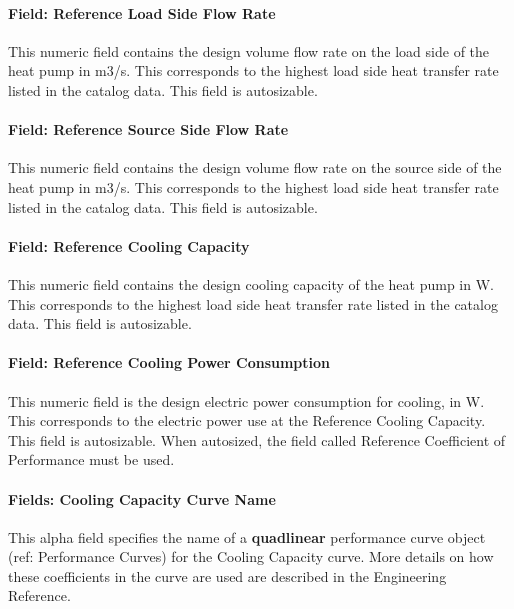 \paragraph{Field: Reference Load Side Flow Rate}\label{field-rated-load-side-flow-rate}

This numeric field contains the design volume flow rate on the load side of the heat pump in m3/s. This corresponds to the highest load side heat transfer rate listed in the catalog data. This field is autosizable.

\paragraph{Field: Reference Source Side Flow Rate}\label{field-rated-source-side-flow-rate}

This numeric field contains the design volume flow rate on the source side of the heat pump in m3/s. This corresponds to the highest load side heat transfer rate listed in the catalog data. This field is autosizable.

\paragraph{Field: Reference Cooling Capacity}\label{field-rated-cooling-capacity}

This numeric field contains the design cooling capacity of the heat pump in W. This corresponds to the highest load side heat transfer rate listed in the catalog data. This field is autosizable.

\paragraph{Field: Reference Cooling Power Consumption}\label{field-rated-cooling-power-consumption}

This numeric field is the design electric power consumption for cooling, in W. This corresponds to the electric power use at the Reference Cooling Capacity. This field is autosizable. When autosized, the field called Reference Coefficient of Performance must be used.

\paragraph{Fields: Cooling Capacity Curve Name}\label{fields-cooling-capacity-curve-name}

This alpha field specifies the name of a \textbf{quadlinear} performance curve object (ref: Performance Curves) for the Cooling Capacity curve. More details on how these coefficients in the curve are used are described in the Engineering Reference.

